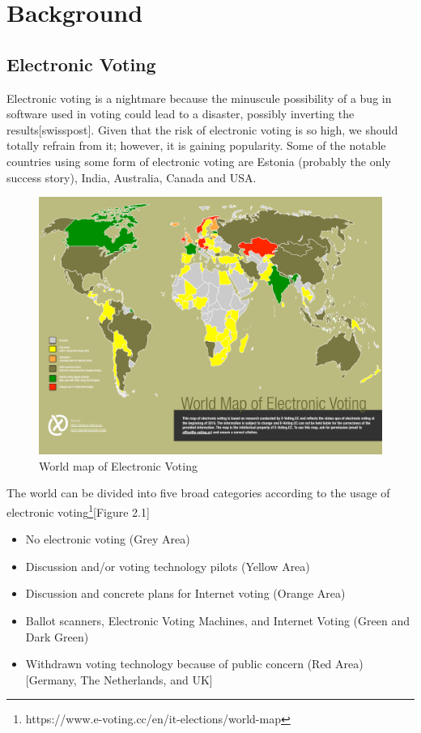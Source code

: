 \chapter{Background}
\label{cha:background}


\section{Electronic Voting}
   Electronic voting is a nightmare because the minuscule possibility of 
   a bug in software used in voting could lead to a disaster, possibly 
   inverting the results[swisspost]. Given that the risk of 
   electronic voting is 
   so high, we should totally refrain from it; however,
   it is gaining popularity. Some of the notable countries using some form
   of electronic voting are Estonia (probably the only success story), India,
   Australia, Canada and USA. 
    \begin{figure}[htb]
	\begin{center}
	\includegraphics[scale=0.5]{e-voting_worldmap_2015.pdf}
	\caption{World map of Electronic Voting}
	\end{center}
  \end{figure}  
   
  The world can be divided into five broad categories according to 
  the usage of electronic voting\footnote{https://www.e-voting.cc/en/it-elections/world-map}[Figure 2.1]
  \begin{itemize}
  \item No electronic voting (Grey Area)
  \item Discussion and/or voting technology pilots (Yellow Area)
  \item Discussion and concrete plans for Internet voting (Orange Area)
  \item Ballot scanners, Electronic Voting Machines, and Internet Voting
        (Green and Dark Green)
  \item Withdrawn voting technology because of public concern (Red Area)
        [Germany, The Netherlands, and UK]  
  \end{itemize}    
  
